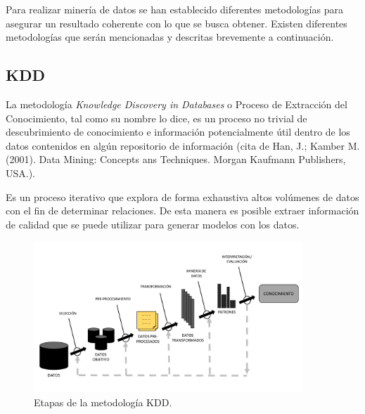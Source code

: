 
Para realizar minería de datos se han establecido diferentes metodologías para asegurar un resultado coherente con lo que se busca obtener. Existen diferentes metodologías que serán mencionadas y descritas brevemente a continuación.

\subsection{KDD}


La metodología \textit{Knowledge Discovery in Databases} o Proceso de Extracción del Conocimiento, tal como su nombre lo dice, es un proceso no trivial de descubrimiento de conocimiento e información potencialmente útil dentro de los datos contenidos en algún repositorio de información (cita de Han, J.; Kamber M. (2001). Data Mining: Concepts ans Techniques. Morgan Kaufmann Publishers, USA.). 

Es un proceso iterativo que explora de forma exhaustiva altos volúmenes de datos con el fin de determinar relaciones. De esta manera es posible extraer información de calidad que se puede utilizar para generar modelos con los datos. 

\begin{figure}[H]
  \centering
    \includegraphics[width=0.9\textwidth]{Figuras/KDD}
      \caption{Etapas de la metodología KDD.}
    \label{fig:kdd}
\end{figure}

